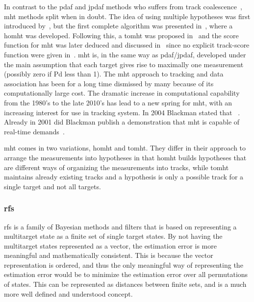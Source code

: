 In contrast to the \gls{pdaf} and \gls{jpdaf} methods who suffers from track \gls{coalescence}~\cite{Fitzgerald1986,Blom2000}, \gls{mht} methods split when in doubt. The idea of using multiple hypotheses was first introduced by~\cite{Singer1974}, but the first complete algorithm was presented in~\cite{Reid1979}, where a \gls{homht} was developed. Following this, a \gls{tomht} was proposed in~\cite{Kurien1990} and the \gls{score} function for \gls{mht} was later deduced and discussed in~\cite{Bar-Shalom2007} since no explicit track-score function were given in~\cite{Kurien1990}. \gls{mht} is, in the same way as \gls{pdaf}/\gls{jpdaf}, developed under the main assumption that each target gives rise to maximally one \gls{measurement} (possibly zero if \gls{Pd} less than 1). The \gls{mht} approach to tracking and data association has been for a long time dismissed by many because of its computationally large cost. The dramatic increase in computational capability from the 1980's to the late 2010's has lead to a new spring for \gls{mht}, with an increasing interest for use in tracking system. In 2004 Blackman stated that ~\cite{Blackman2004}. Already in 2001 did Blackman publish a demonstration that \gls{mht} is capable of real-time demands~\cite{Blackman2001}.

\gls{mht} comes in two variations, \gls{homht} and \gls{tomht}. They differ in their approach to arrange the measurements into hypotheses in that \gls{homht} builds hypotheses that are different ways of organizing the measurements into tracks, while \gls{tomht} maintains already existing tracks and a hypothesis is only a possible track for a single target and not all targets.


\subsubsection{\gls{rfs}}
\Gls{rfs} is a family of Bayesian methods and filters that is based on representing a multitarget state as a finite set of single target states. By not having the multitarget states represented as a vector, the estimation error is more meaningful and mathematically consistent. This is because the vector representation is ordered, and thus the only meaningful way of representing the estimation error would be to minimize the estimation error over all permutations of states. This can be represented as distances between finite sets, and is a much more well defined and understood concept. 


